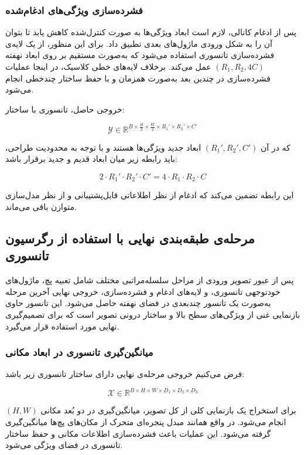 \subsubsection*{فشرده‌سازی ویژگی‌های ادغام‌شده}

پس از ادغام کانالی، لازم است ابعاد ویژگی‌ها به صورت کنترل‌شده کاهش یابد تا بتوان آن را به شکل ورودی ماژول‌های بعدی تطبیق داد. برای این منظور، از یک لایه‌ی فشرده‌سازی تانسوری استفاده می‌شود که به‌صورت مستقیم بر روی ابعاد نهفته $(R_1, R_2, 4C)$ عمل می‌کند. برخلاف لایه‌های خطی کلاسیک، در اینجا عملیات فشرده‌سازی در چندین بعد به‌صورت همزمان و با حفظ ساختار چندخطی انجام می‌شود.

خروجی حاصل، تانسوری با ساختار:

\[
\mathcal{Y} \in \mathbb{R}^{B \times \frac{H}{2} \times \frac{W}{2} \times R_1' \times R_2' \times C'}
\]

که در آن $(R_1', R_2', C')$ ابعاد جدید ویژگی‌ها هستند و با توجه به محدودیت طراحی، باید رابطه زیر میان ابعاد قدیم و جدید برقرار باشد:

\begin{equation}
	2 \cdot R_1' \cdot R_2' \cdot C' = 4 \cdot R_1 \cdot R_2 \cdot C
\end{equation}

این رابطه تضمین می‌کند که ادغام از نظر اطلاعاتی قابل‌پشتیبانی و از نظر مدل‌سازی متوازن باقی می‌ماند.

\subsection{مرحله‌ی طبقه‌بندی نهایی با استفاده از رگرسیون تانسوری}

پس از عبور تصویر ورودی از مراحل سلسله‌مراتبی مختلف شامل تعبیه پچ، ماژول‌های خودتوجهی تانسوری، و لایه‌های ادغام و فشرده‌سازی، خروجی نهایی آخرین مرحله به‌صورت یک تانسور چندبعدی در فضای نهفته حاصل می‌شود. این تانسور حاوی بازنمایی غنی از ویژگی‌های سطح بالا و ساختار درونی تصویر است که برای تصمیم‌گیری نهایی مورد استفاده قرار می‌گیرد.

\subsubsection*{میانگین‌گیری تانسوری در ابعاد مکانی}

فرض می‌کنیم خروجی مرحله‌ی نهایی دارای ساختار تانسوری زیر باشد:

\[
\mathcal{X} \in \mathbb{R}^{B \times H \times W \times D_1 \times D_2 \times D_3}
\]

برای استخراج یک بازنمایی کلی از کل تصویر، میانگین‌گیری در دو بُعد مکانی $(H, W)$ انجام می‌شود.
در واقع همانند مبدل پنجره‌ای متحرک از مکان‌های پچ‌ها میانگین‌گیری گرفته می‌شود.
این عملیات باعث فشرده‌سازی اطلاعات مکانی و حفظ ساختار تانسوری در فضای ویژگی می‌شود.

